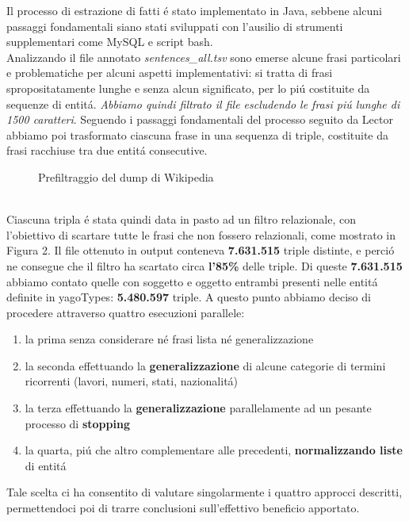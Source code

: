 \documentclass[twocolumn,10pt]{asme2ej}
\begin{document}
Il processo di estrazione di fatti \'e stato implementato in Java, sebbene alcuni passaggi fondamentali siano stati sviluppati con l'ausilio di strumenti supplementari come MySQL e script bash. \\Analizzando il file annotato \textit{sentences\_all.tsv} sono emerse alcune frasi particolari e problematiche per alcuni aspetti implementativi: si tratta di frasi spropositatamente lunghe e senza alcun significato, per lo pi\'u costituite da sequenze di entit\'a. \textit{Abbiamo quindi filtrato il file escludendo le frasi pi\'u lunghe di 1500 caratteri}. Seguendo i passaggi fondamentali del processo seguito da Lector abbiamo poi trasformato ciascuna frase in una sequenza di triple, costituite da frasi racchiuse tra due entit\'a consecutive.
\begin{figure} 
\centerline{}
\caption{Prefiltraggio del dump di Wikipedia}
\label{step1.ps}
\end{figure}
\\Ciascuna tripla \'e stata quindi data in pasto ad un filtro relazionale, con l'obiettivo di scartare tutte le frasi che non fossero relazionali,  come mostrato in Figura 2. Il file ottenuto in output conteneva \textbf{7.631.515} triple distinte, e perci\'o ne consegue che  il filtro ha scartato circa \textbf{l'85\%} delle triple. Di queste \textbf{7.631.515} abbiamo contato quelle con soggetto e oggetto entrambi presenti nelle entit\'a definite in yagoTypes: \textbf{5.480.597} triple.  A questo punto abbiamo deciso di procedere attraverso quattro esecuzioni parallele: 

\begin{enumerate}
\item la prima senza considerare n\'e frasi lista n\'e generalizzazione
\item la seconda effettuando la \textbf{generalizzazione} di alcune categorie di termini ricorrenti (lavori, numeri, stati, nazionalit\'a)
\item la terza effettuando la \textbf{generalizzazione} parallelamente ad un pesante processo di \textbf{stopping}
\item la quarta, pi\'u che altro complementare alle  precedenti, \textbf{normalizzando liste} di entit\'a
\end{enumerate}

Tale scelta  ci ha consentito di valutare singolarmente i quattro approcci descritti, permettendoci poi di trarre conclusioni sull'effettivo beneficio apportato.
\end{document}
